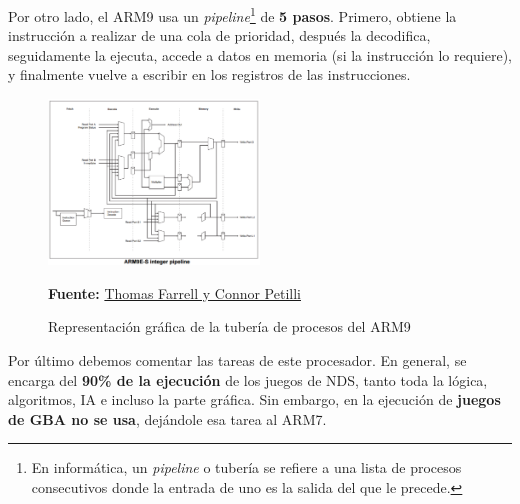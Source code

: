 \vspace{0.5cm}

Por otro lado, el ARM9 usa un \textit{pipeline}\footnote{En informática, un \textit{pipeline} o tubería se refiere a una lista de procesos consecutivos donde la entrada de uno es la salida del que le precede.} de \textbf{5 pasos}. Primero, obtiene la instrucción a realizar de una cola de prioridad, después la decodifica, seguidamente la ejecuta, accede a datos en memoria (si la instrucción lo requiere), y finalmente vuelve a escribir en los registros de las instrucciones.

\vspace{0.5cm}

 \begin{figure}[htbp]
\centering
  \includegraphics[width=0.5\textwidth]{archivos/arm9pipeline.png}
  \caption{Representación gráfica de la tubería de procesos del ARM9}
\textbf{Fuente:} \href{http://meseec.ce.rit.edu/551-projects/fall2015/3-1.pdf}{Thomas Farrell y Connor Petilli}
  \label{fig:arm9pipeline}
\end{figure}

\vspace{0.5cm}

Por último debemos comentar las tareas de este procesador. En general, se encarga del \textbf{90\% de la ejecución} de los juegos de NDS, tanto toda la lógica, algoritmos, IA e incluso la parte gráfica. Sin embargo, en la ejecución de \textbf{juegos de GBA no se usa}, dejándole esa tarea al ARM7.

\vspace{1cm}

